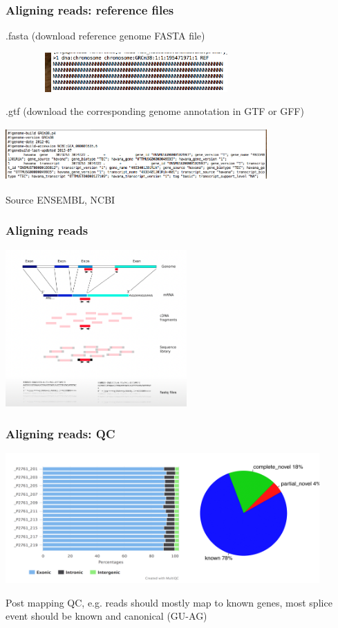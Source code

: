 \documentclass{beamer}\usepackage[]{graphicx}\usepackage[]{color}
\begin{document}
\begin{frame}
\frametitle{Aligning reads: reference files}
.fasta (download reference genome FASTA file)
\newline
\begin{center}
\includegraphics[width=10cm, height=1.5cm]{Images/ref.png}
\end{center}
.gtf (download the corresponding genome annotation in GTF or GFF)
\begin{center}
\includegraphics[width=10cm, height=2cm]{Images/ref_annotation.png}
\end{center}
\vspace{5mm}
\begin{block}{Source}
ENSEMBL, NCBI
\end{block}
\end{frame}

\begin{frame}
\frametitle{Aligning reads}
\centering
\includegraphics[height=6cm]{Images/map2.png}
\end{frame}

\begin{frame}
\frametitle{Aligning reads: QC}
\begin{center}
\includegraphics[width=12cm]{Images/map_qual.png}
\end{center}
Post mapping QC, e.g. reads should mostly map to known genes, most splice event should be known and canonical (GU-AG)
\end{frame}
\end{document}
